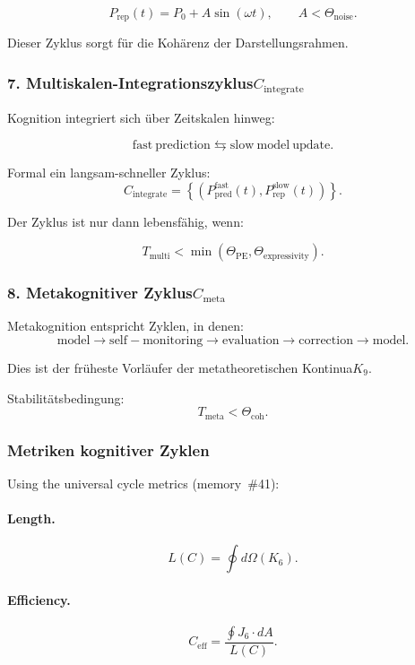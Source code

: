 \[
 P_{\mathrm{rep}}(t) = P_0 + A\sin(\omega t),\qquad
 A < \Theta_{\mathrm{noise}}.
\]

Dieser Zyklus sorgt für die Kohärenz der Darstellungsrahmen.

\subsubsection{7. Multiskalen-Integrationszyklus$C_{\mathrm{integrate}}$}

Kognition integriert sich über Zeitskalen hinweg:

\[
 \mathrm{fast\ prediction}
 \leftrightarrows
 \mathrm{slow\ model\ update}.
\]

Formal ein langsam-schneller Zyklus:
\[
 C_{\mathrm{integrate}} =
 \left\{
   (P_{\mathrm{pred}}^{\mathrm{fast}}(t),
    P_{\mathrm{rep}}^{\mathrm{slow}}(t))
 \right\}.
\]

Der Zyklus ist nur dann lebensfähig, wenn:

\[
 T_{\mathrm{multi}} < \min(\Theta_{\mathrm{PE}},\Theta_{\mathrm{expressivity}}).
\]

\subsubsection{8. Metakognitiver Zyklus$C_{\mathrm{meta}}$}

Metakognition entspricht Zyklen, in denen:
\[
 \mathrm{model}
 \to 
 \mathrm{self-monitoring}
 \to
 \mathrm{evaluation}
 \to
 \mathrm{correction}
 \to
 \mathrm{model}.
\]

Dies ist der früheste Vorläufer der metatheoretischen Kontinua$K_9$.

Stabilitätsbedingung:
\[
 T_{\mathrm{meta}} < \Theta_{\mathrm{coh}}.
\]

\subsubsection{Metriken kognitiver Zyklen}

Using the universal cycle metrics (memory~\#41):

\paragraph{Length.}
\[
  L(C)=\oint d\Omega(K_6).
\]

\paragraph{Efficiency.}
\[
  C_{\mathrm{eff}}
    = \frac{\oint J_6\cdot dA}{L(C)}.
\]

